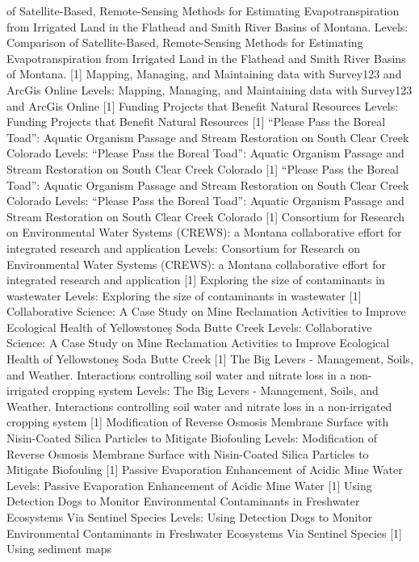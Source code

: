 \documentclass[]{article}
\begin{document}
of Satellite-Based, Remote-Sensing Methods for Estimating
Evapotranspiration from Irrigated Land in the Flathead and Smith River
Basins of Montana. Levels: Comparison of Satellite-Based, Remote-Sensing
Methods for Estimating Evapotranspiration from Irrigated Land in the
Flathead and Smith River Basins of Montana. {[}1{]} Mapping, Managing,
and Maintaining data with Survey123 and ArcGis Online Levels: Mapping,
Managing, and Maintaining data with Survey123 and ArcGis Online {[}1{]}
Funding Projects that Benefit Natural Resources Levels: Funding Projects
that Benefit Natural Resources {[}1{]} ``Please Pass the Boreal Toad'':
Aquatic Organism Passage and Stream Restoration on South Clear Creek
Colorado Levels: ``Please Pass the Boreal Toad'': Aquatic Organism
Passage and Stream Restoration on South Clear Creek Colorado {[}1{]}
``Please Pass the Boreal Toad'': Aquatic Organism Passage and Stream
Restoration on South Clear Creek Colorado Levels: ``Please Pass the
Boreal Toad'': Aquatic Organism Passage and Stream Restoration on South
Clear Creek Colorado {[}1{]} Consortium for Research on Environmental
Water Systems (CREWS): a Montana collaborative effort for integrated
research and application Levels: Consortium for Research on
Environmental Water Systems (CREWS): a Montana collaborative effort for
integrated research and application {[}1{]} Exploring the size of
contaminants in wastewater Levels: Exploring the size of contaminants in
wastewater {[}1{]} Collaborative Science: A Case Study on Mine
Reclamation Activities to Improve Ecological Health of Yellowstone۪s
Soda Butte Creek Levels: Collaborative Science: A Case Study on Mine
Reclamation Activities to Improve Ecological Health of Yellowstone۪s
Soda Butte Creek {[}1{]} The Big Levers - Management, Soils, and
Weather. Interactions controlling soil water and nitrate loss in a
non-irrigated cropping system Levels: The Big Levers - Management,
Soils, and Weather. Interactions controlling soil water and nitrate loss
in a non-irrigated cropping system {[}1{]} Modification of Reverse
Osmosis Membrane Surface with Nisin-Coated Silica Particles to Mitigate
Biofouling Levels: Modification of Reverse Osmosis Membrane Surface with
Nisin-Coated Silica Particles to Mitigate Biofouling {[}1{]} Passive
Evaporation Enhancement of Acidic Mine Water Levels: Passive Evaporation
Enhancement of Acidic Mine Water {[}1{]} Using Detection Dogs to Monitor
Environmental Contaminants in Freshwater Ecosystems Via Sentinel Species
Levels: Using Detection Dogs to Monitor Environmental Contaminants in
Freshwater Ecosystems Via Sentinel Species {[}1{]} Using sediment maps
\end{document}
